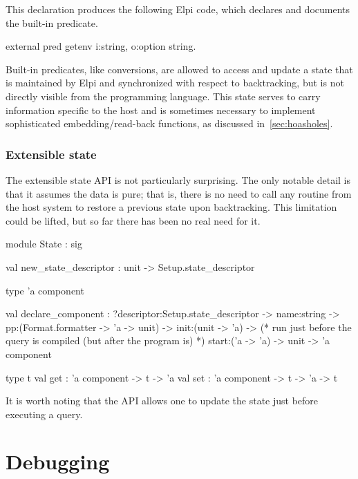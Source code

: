\documentclass[a4paper, 11pt]{book}
\begin{document}
\noindent
This declaration produces the following Elpi code, which declares and
documents the built-in predicate.

\begin{elpicode}
external pred getenv i:string, o:option string.
\end{elpicode}

Built-in predicates, like conversions, are allowed to access and update a
state that is maintained by Elpi and synchronized with respect to
backtracking, but is not directly visible from the programming language. This
state serves to carry information specific to the host and is sometimes necessary to
implement sophisticated embedding/read-back functions, as discussed
in~\cref{sec:hoasholes}.

\subsubsection{Extensible state}\label{sec:state}

The extensible state API is not particularly surprising. The only notable
detail is that it assumes the data is pure; that is, there is no need to call
any routine from the host system to restore a previous state upon
backtracking. This limitation could be lifted, but so far there has been no
real need for it.

\begin{ocamlcode}
module State : sig

  val new_state_descriptor : unit -> Setup.state_descriptor

  type 'a component

  val declare_component :
    ?descriptor:Setup.state_descriptor ->
    name:string ->
    pp:(Format.formatter -> 'a -> unit) ->
    init:(unit -> 'a) ->
    (* run just before the query is compiled (but after the program is) *)
    start:('a -> 'a) ->
    unit ->
      'a component

  type t
  val get : 'a component -> t -> 'a
  val set : 'a component -> t -> 'a -> t
\end{ocamlcode}

\noindent
It is worth noting that the API allows one to update the state just before
executing a query.

\section{Debugging}\label{sec:trace}
\end{document}

